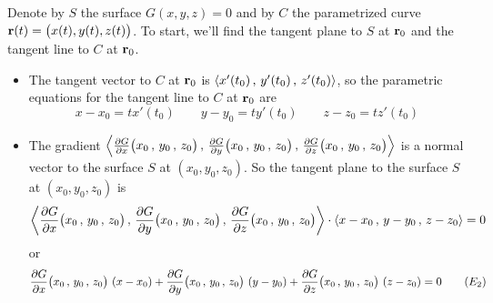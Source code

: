 \begin{solution} 
Denote by $S$ the surface $G(x,y,z)=0$ and by $C$ the parametrized curve 
$\mathbf{r}(t)=\big(x(t),y(t),z(t)\big)$. To start, we'll find the tangent plane to $S$ at $\mathbf{r}_0$ and the tangent line to $C$ at $\mathbf{r}_0$.  
\begin{itemize}
\item
The tangent vector to $C$ at $\mathbf{r}_0$ is 
$\left< x'(t_0)\,,\,y'(t_0)\,,\,z'(t_0) \right>$, so the parametric equations for
the tangent line to $C$ at $\mathbf{r}_0$ are
\begin{equation*}
x-x_0 = t x'(t_0)\qquad
y-y_0 = t y'(t_0)\qquad
z-z_0 = t z'(t_0)
\tag{$E_1$}\end{equation*}

\item
The gradient 
$\llt\pdiff{G}{x}\big( x_0\,,\,y_0\,,\,z_0\big)\,,\,
\pdiff{G}{y}\big( x_0\,,\,y_0\,,\,z_0\big)\,,\,
\pdiff{G}{z}\big( x_0\,,\,y_0\,,\,z_0\big)\rgt$ is a normal vector 
to the surface $S$ at $(x_0,y_0,z_0)$. So the tangent plane
to the surface $S$ at $(x_0,y_0,z_0)$ is
\begin{equation*}
\llt\pdiff{G}{x}\big( x_0\,,\,y_0\,,\,z_0\big)\,,\,
\pdiff{G}{y}\big( x_0\,,\,y_0\,,\,z_0\big)\,,\,
\pdiff{G}{z}\big( x_0\,,\,y_0\,,\,z_0\big)\rgt \cdot
\llt x-x_0\,,\, y-y_0\,,\,z-z_0\rgt = 0
\end{equation*}
or
\begin{equation*}
\pdiff{G}{x}\big( x_0\,,\,y_0\,,\,z_0\big)\ (x-x_0)
+\pdiff{G}{y}\big( x_0\,,\,y_0\,,\,z_0\big)\ (y-y_0)
+\pdiff{G}{z}\big( x_0\,,\,y_0\,,\,z_0\big)\ (z-z_0) = 0
\tag{$E_2$}\end{equation*}


\end{itemize}
\end{solution}
